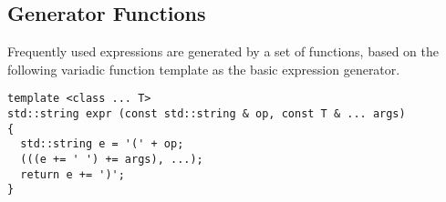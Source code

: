 
\subsection*{{\SMTLIB} Generator Functions}





Frequently used {\SMTLIB} expressions are generated by a set of functions, based on the following variadic function template as the basic expression generator.

\begin{lstlisting}[style=c++]
template <class ... T>
std::string expr (const std::string & op, const T & ... args)
{
  std::string e = '(' + op;
  (((e += ' ') += args), ...);
  return e += ')';
}
\end{lstlisting}

